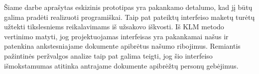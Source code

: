 Šiame darbe aprašytas eskizinis prototipas yra pakankamo detalumo, kad jį būtų galima
pradėti realizuoti programiškai. Taip pat pateiktų interfeiso maketų turėtų užtekti
tikslesniems reikalavimams iš užsakovo iškvosti.
Iš KLM metodo vertinimo matyti, jog projektuojamas interfeisas yra pakankamai našus
ir patenkina ankstesniajame dokumente apibrėtus našumo ribojimus.
Remiantis pažintinės peržvalgos analize taip pat galima teigti, jog šio interfeiso
išmokstamumas atitinka antrajame dokumente apibrėžtų personų gebėjimus.


\newpage

